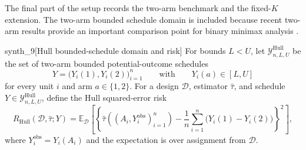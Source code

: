 The final part of the setup records the two-arm benchmark and the fixed-\(K\) extension. The two-arm bounded schedule domain is included because recent two-arm results provide an important comparison point for binary minimax analysis \citep{sudijono_dobriban_tchetgen_2026_sharp,hull_2026_bounded}.

\begin{definitionv}{synth_9}[Hull bounded-schedule domain and risk]
For bounds \(L<U\), let \(\mathcal Y^{\mathrm{Hull}}_{n,L,U}\) be the set of two-arm bounded potential-outcome schedules
\[
Y=\bigl(Y_i(1),Y_i(2)\bigr)_{i=1}^n
\qquad\text{with}\qquad
Y_i(a)\in[L,U]
\]
for every unit \(i\) and arm \(a\in\{1,2\}\). For a design \(\mathcal D\), estimator \(\widehat\tau\), and schedule \(Y\in\mathcal Y^{\mathrm{Hull}}_{n,L,U}\), define the Hull squared-error risk
\[
R_{\mathrm{Hull}}(\mathcal D,\widehat\tau;Y)
=\mathbb E_{\mathcal D}\left[\left\{\widehat\tau((A_i,Y_i^{\mathrm{obs}})_{i=1}^n)-\frac1n\sum_{i=1}^n\bigl(Y_i(1)-Y_i(2)\bigr)\right\}^2\right],
\]
where \(Y_i^{\mathrm{obs}}=Y_i(A_i)\) and the expectation is over assignment from \(\mathcal D\).
\end{definitionv}

